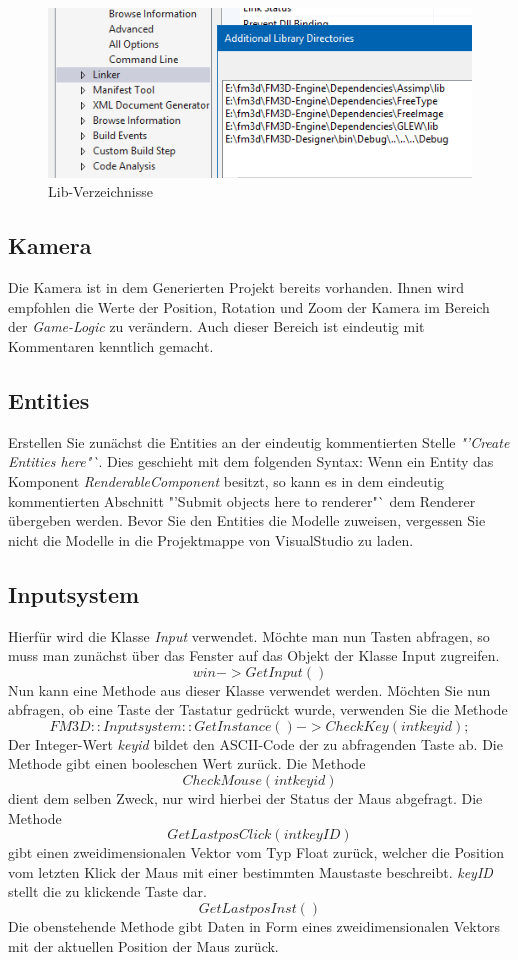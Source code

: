 \begin{figure}
	\begin{center}
		\includegraphics[width=\textwidth]{04verwendung/Engine/lib.png}
		\caption{Lib-Verzeichnisse}\label{liblib}
	\end{center}
\end{figure}

\subsection{Kamera}
Die Kamera ist in dem Generierten Projekt bereits vorhanden. Ihnen wird empfohlen die Werte der Position, Rotation und Zoom der Kamera im Bereich der \textit{Game-Logic} zu verändern. Auch dieser Bereich ist eindeutig mit Kommentaren kenntlich gemacht.

\subsection{Entities}
\todo[inline]{!!!}
Erstellen Sie zunächst die Entities an der eindeutig kommentierten Stelle \textit{"'Create Entities here"`}. Dies geschieht mit dem folgenden Syntax:
Wenn ein Entity das Komponent \textit{RenderableComponent} besitzt, so kann es in dem eindeutig kommentierten Abschnitt "'Submit objects here to renderer"` dem Renderer übergeben werden.
Bevor Sie den Entities die Modelle zuweisen, vergessen Sie nicht die Modelle in die Projektmappe von VisualStudio zu laden.

\subsection{Inputsystem}
\label{inputsystemver}
Hierfür wird die Klasse \textit{Input} verwendet. Möchte man nun Tasten abfragen, so muss man zunächst über das Fenster auf das Objekt der Klasse Input zugreifen. 
$$win->GetInput()$$
Nun kann eine Methode aus dieser Klasse verwendet werden.
Möchten Sie nun abfragen, ob eine Taste der Tastatur gedrückt wurde, verwenden Sie die Methode
$$FM3D::Inputsystem::GetInstance()->CheckKey(int  keyid);$$
Der Integer-Wert \textit{keyid} bildet den ASCII-Code der zu abfragenden Taste ab. Die Methode gibt einen booleschen Wert zurück. Die Methode $$CheckMouse(int  keyid)$$ dient dem selben Zweck, nur wird hierbei der Status der Maus abgefragt.
Die Methode $$GetLastposClick(int keyID)$$
gibt einen zweidimensionalen Vektor vom Typ Float zurück, welcher die Position vom letzten Klick der Maus mit einer bestimmten Maustaste beschreibt. \textit{keyID} stellt die zu klickende Taste dar. 
$$GetLastposInst()$$
Die obenstehende Methode gibt Daten in Form eines zweidimensionalen Vektors mit der aktuellen Position der Maus zurück.

